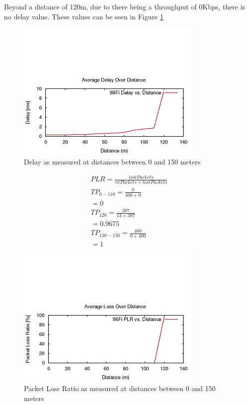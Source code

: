 Beyond a distance of 120m, due to there being a throughput of 0Kbps, there is no
delay value. These values can be seen in Figure \ref{fig:QBdelay}

\begin{figure}[H]
	\centering
	\includegraphics[width=0.8\textwidth]{images/EE500/QB/Images/wifi-delay}
	\caption{Delay as measured at distances between 0 and 150 meters}
	\label{fig:QBdelay}
\end{figure}

\begin{gather*}
	PLR=\frac{lostPackets}{rxPackets+lostPackets} \\
	TP_{0-110}=\frac{0}{400+0}\\
	= 0 \\
	TP_{120}= \frac{387}{13+387}\\
	= 0.9675 \\
	TP_{130-150}=\frac{400}{0+400}\\
	= 1
\end{gather*}

\begin{figure}[H]
	\centering
	\includegraphics[width=0.8\textwidth]{images/EE500/QB/Images/wifi-loss}
	\caption{Packet Loss Ratio as measured at distances between 0 and 150
	meters}
	\label{fig:QBloss}
\end{figure}

